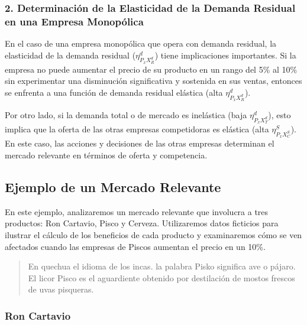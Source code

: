 \documentclass[
  a4paper,
]{article}
\theoremstyle{definition}
\theoremstyle{remark}
\begin{document}
\hypertarget{determinaciuxf3n-de-la-elasticidad-de-la-demanda-residual-en-una-empresa-monopuxf3lica}{%
\subsubsection{2. Determinación de la Elasticidad de la Demanda Residual
en una Empresa
Monopólica}\label{determinaciuxf3n-de-la-elasticidad-de-la-demanda-residual-en-una-empresa-monopuxf3lica}}

En el caso de una empresa monopólica que opera con demanda residual, la
elasticidad de la demanda residual (\(\eta_{P_{x}X_R^d}^d\)) tiene
implicaciones importantes. Si la empresa no puede aumentar el precio de
su producto en un rango del 5\% al 10\% sin experimentar una disminución
significativa y sostenida en sus ventas, entonces se enfrenta a una
función de demanda residual elástica (alta \(\eta_{P_{x}X_R^d}^d\)).

Por otro lado, si la demanda total o de mercado es inelástica (baja
\(\eta_{P_{x}X_T^d}^d\)), esto implica que la oferta de las otras
empresas competidoras es elástica (alta \(\eta_{P_{x}X_C^S}^S\)). En
este caso, las acciones y decisiones de las otras empresas determinan el
mercado relevante en términos de oferta y competencia.

\hypertarget{ejemplo-de-un-mercado-relevante}{%
\subsection{Ejemplo de un Mercado
Relevante}\label{ejemplo-de-un-mercado-relevante}}

En este ejemplo, analizaremos un mercado relevante que involucra a tres
productos: Ron Cartavio, Pisco y Cerveza. Utilizaremos datos ficticios
para ilustrar el cálculo de los beneficios de cada producto y
examinaremos cómo se ven afectados cuando las empresas de Piscos
aumentan el precio en un 10\%.

\begin{quote}
En quechua el idioma de los incas. la palabra Pisko significa ave o
pájaro. El licor Pisco es el aguardiente obtenido por destilación de
mostos frescos de uvas pisqueras.
\end{quote}

\hypertarget{ron-cartavio}{%
\subsubsection{Ron Cartavio}\label{ron-cartavio}}
\end{document}
